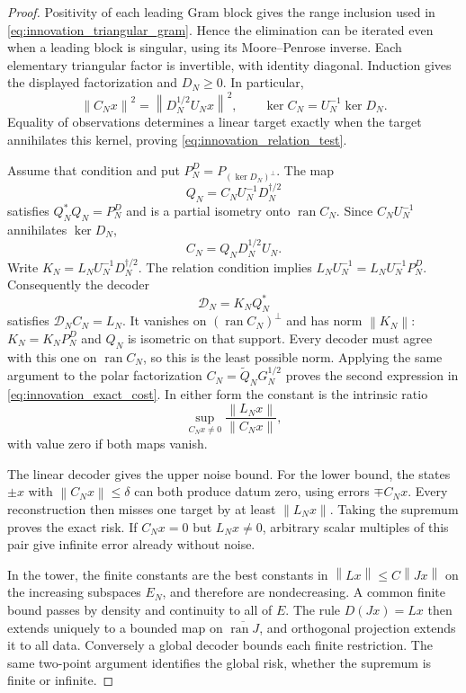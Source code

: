 \documentclass[11pt,a4paper]{amsart}
\numberwithin{equation}{section}
\theoremstyle{definition}
\theoremstyle{remark}
\DeclareMathOperator{\ran}{ran}
\newcommand{\norm}[1]{\left\lVert#1\right\rVert}
\begin{document}
\begin{proof}
Positivity of each leading Gram block gives the range inclusion used in \eqref{eq:innovation_triangular_gram}. Hence the elimination can be iterated even when a leading block is singular, using its Moore--Penrose inverse. Each elementary triangular factor is invertible, with identity diagonal. Induction gives the displayed factorization and $D_N\ge0$. In particular,
\[
 \norm{C_Nx}^2=\norm{D_N^{1/2}U_Nx}^2,
 \qquad \ker C_N=U_N^{-1}\ker D_N.
\]
Equality of observations determines a linear target exactly when the target annihilates this kernel, proving \eqref{eq:innovation_relation_test}.

Assume that condition and put $P_N^D=P_{(\ker D_N)^\perp}$. The map
\[
 Q_N=C_NU_N^{-1}D_N^{\dagger/2}
\]
satisfies $Q_N^*Q_N=P_N^D$ and is a partial isometry onto $\ran C_N$. Since $C_NU_N^{-1}$ annihilates $\ker D_N$,
\[
 C_N=Q_ND_N^{1/2}U_N.
\]
Write $K_N=L_NU_N^{-1}D_N^{\dagger/2}$. The relation condition implies $L_NU_N^{-1}=L_NU_N^{-1}P_N^D$. Consequently the decoder
\begin{equation}\label{eq:innovation_canonical_decoder}
 \mathscr D_N=K_NQ_N^*
\end{equation}
satisfies $\mathscr D_NC_N=L_N$. It vanishes on $(\ran C_N)^\perp$ and has norm $\norm{K_N}$: $K_N=K_NP_N^D$ and $Q_N$ is isometric on that support. Every decoder must agree with this one on $\ran C_N$, so this is the least possible norm. Applying the same argument to the polar factorization $C_N=\widetilde Q_NG_N^{1/2}$ proves the second expression in \eqref{eq:innovation_exact_cost}. In either form the constant is the intrinsic ratio
\[
 \sup_{C_Nx\ne0}\frac{\norm{L_Nx}}{\norm{C_Nx}},
\]
with value zero if both maps vanish.

The linear decoder gives the upper noise bound. For the lower bound, the states $\pm x$ with $\norm{C_Nx}\le\delta$ can both produce datum zero, using errors $\mp C_Nx$. Every reconstruction then misses one target by at least $\norm{L_Nx}$. Taking the supremum proves the exact risk. If $C_Nx=0$ but $L_Nx\ne0$, arbitrary scalar multiples of this pair give infinite error already without noise.

In the tower, the finite constants are the best constants in $\norm{Lx}\le C\norm{Jx}$ on the increasing subspaces $E_N$, and therefore are nondecreasing. A common finite bound passes by density and continuity to all of $E$. The rule $D(Jx)=Lx$ then extends uniquely to a bounded map on $\overline{\ran J}$, and orthogonal projection extends it to all data. Conversely a global decoder bounds each finite restriction. The same two-point argument identifies the global risk, whether the supremum is finite or infinite.
\end{proof}
\end{document}
